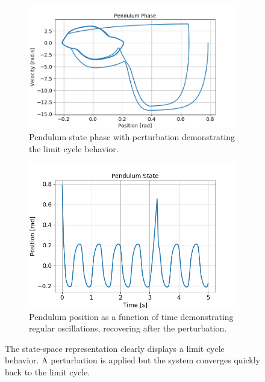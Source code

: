 \documentclass{cmc}
\begin{document}
\begin{figure}[ht]
  \begin{subfigure}[b]{0.48\textwidth}
    \includegraphics[width=\textwidth]{figures/ex2b-c/Pendulum_Phase_Plot.png}
    \caption{Pendulum state phase with perturbation demonstrating the limit cycle behavior.}
    \label{fig:ex2b-state-phase}
  \end{subfigure}
  \begin{subfigure}[b]{0.48\textwidth}
    \includegraphics[width=\textwidth]{figures/ex2b-c/Pendulum_State_Plot.png}
    \caption{Pendulum position as a function of time demonstrating regular oscillations, recovering after the perturbation.}
    \label{fig:ex2b-state}
  \end{subfigure}
  \caption{The state-space representation clearly displays a limit cycle behavior. A perturbation is applied but the system converges quickly back to the limit cycle.}
  \label{fig:ex2b}
\end{figure}
\end{document}
